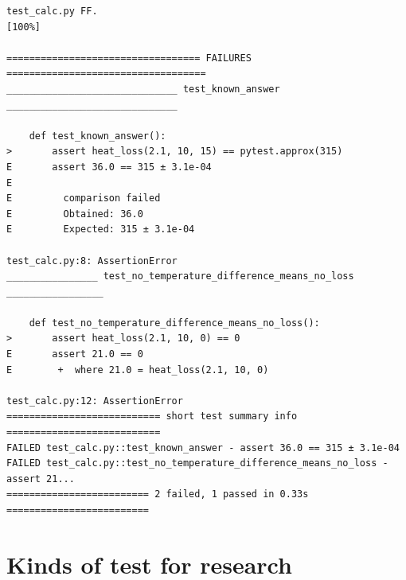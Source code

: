 \begin{lstlisting}[language=text]
test_calc.py FF.                                                         [100%]

================================== FAILURES ===================================
______________________________ test_known_answer ______________________________

    def test_known_answer():
>       assert heat_loss(2.1, 10, 15) == pytest.approx(315)
E       assert 36.0 == 315 ± 3.1e-04
E
E         comparison failed
E         Obtained: 36.0
E         Expected: 315 ± 3.1e-04

test_calc.py:8: AssertionError
________________ test_no_temperature_difference_means_no_loss _________________

    def test_no_temperature_difference_means_no_loss():
>       assert heat_loss(2.1, 10, 0) == 0
E       assert 21.0 == 0
E        +  where 21.0 = heat_loss(2.1, 10, 0)

test_calc.py:12: AssertionError
=========================== short test summary info ===========================
FAILED test_calc.py::test_known_answer - assert 36.0 == 315 ± 3.1e-04
FAILED test_calc.py::test_no_temperature_difference_means_no_loss - assert 21...
========================= 2 failed, 1 passed in 0.33s =========================
\end{lstlisting}

\section{Kinds of test for research}\label{kinds-of-test-for-research}

